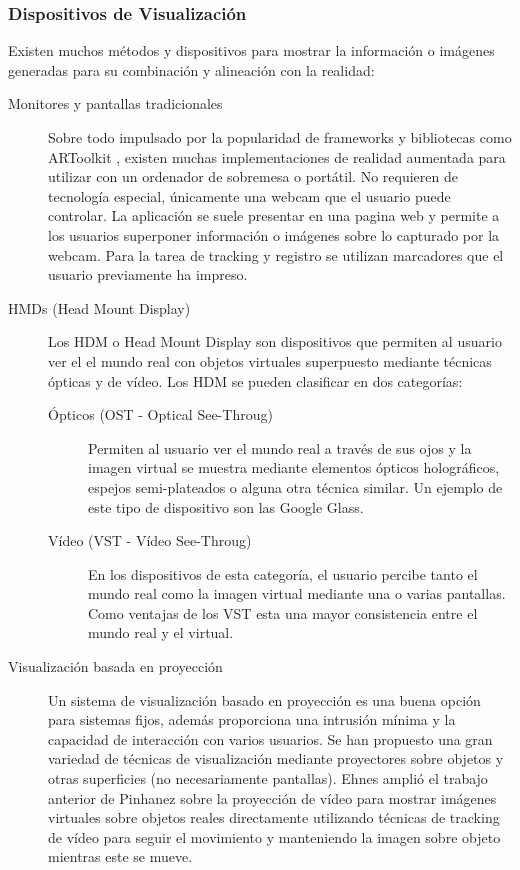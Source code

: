 \subsubsection{Dispositivos  de Visualización}
Existen  muchos métodos y dispositivos para mostrar la información o imágenes generadas para su combinación y alineación con la realidad: 
\begin{description}
\item[Monitores y pantallas tradicionales]
  Sobre todo impulsado por la popularidad de frameworks y bibliotecas como ARToolkit \cite{Kato}, existen muchas implementaciones de realidad aumentada para utilizar con un ordenador de sobremesa o portátil. No requieren de tecnología especial, únicamente una webcam que el usuario puede controlar. La aplicación se suele presentar en una pagina web y permite a los usuarios superponer información o imágenes sobre lo capturado por la webcam. Para la tarea de tracking y registro se utilizan marcadores que el usuario previamente ha impreso.
  
\item[HMDs (Head Mount Display)] Los HDM o Head Mount Display son dispositivos que permiten al usuario ver el el mundo real con objetos virtuales superpuesto mediante técnicas ópticas y de vídeo. Los HDM se pueden clasificar en dos categorías:
 \begin{description}
\item[Ópticos (OST - Optical See-Throug)] Permiten al usuario ver el mundo real a través de sus ojos y la imagen virtual se muestra mediante elementos ópticos holográficos, espejos semi-plateados o alguna otra técnica similar. Un ejemplo de este tipo de dispositivo son las Google Glass.
    
  \item[Vídeo (VST - Vídeo See-Throug)] En los dispositivos de esta categoría, el usuario percibe tanto el mundo real como la imagen virtual mediante una o varias pantallas. Como ventajas de los VST esta una mayor consistencia entre el mundo real y el virtual.
  \end{description}
  
\item[Visualización basada en proyección]
 Un sistema de visualización basado en proyección es una buena opción para sistemas fijos, además proporciona una intrusión mínima y la capacidad de interacción con varios usuarios.
  Se han propuesto una gran variedad de técnicas de visualización mediante proyectores sobre objetos y otras superficies (no necesariamente pantallas). Ehnes \cite{Ehnes} amplió el trabajo anterior de Pinhanez \cite{Pinhanez} sobre la proyección de vídeo para mostrar imágenes virtuales sobre objetos reales directamente utilizando técnicas de tracking de vídeo para seguir el movimiento y manteniendo la imagen sobre objeto mientras este se mueve.
  

\end{description}
